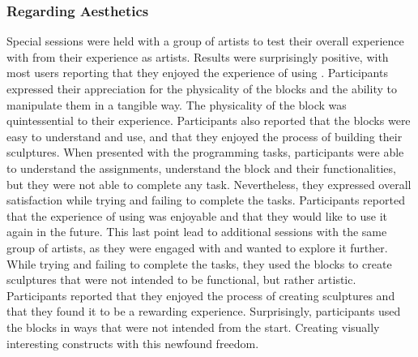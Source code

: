 \subsubsection{Regarding Aesthetics}
\label{sec:results:validation:aesthetics}
Special sessions were held with a group of artists to test their overall experience with \sculpt from their experience as artists.
Results were surprisingly positive, with most users reporting that they enjoyed the experience of using \sculpt.
Participants expressed their appreciation for the physicality of the blocks and the ability to manipulate them in a tangible way.
The physicality of the block was quintessential to their experience.
Participants also reported that the blocks were easy to understand and use, and that they enjoyed the process of building their sculptures.
When presented with the programming tasks, participants were able to understand the assignments, understand the block and their functionalities, but they were not able to complete any task.
Nevertheless, they expressed overall satisfaction while trying and failing to complete the tasks.
Participants reported that the experience of using \sculpt was enjoyable and that they would like to use it again in the future.
This last point lead to additional sessions with the same group of artists, as they were engaged with \sculpt and wanted to explore it further.
While trying and failing to complete the tasks, they used the blocks to create sculptures that were not intended to be functional, but rather artistic.
Participants reported that they enjoyed the process of creating sculptures and that they found it to be a rewarding experience.
Surprisingly, participants used the blocks in ways that were not intended from the start. Creating visually interesting constructs with this newfound freedom.

